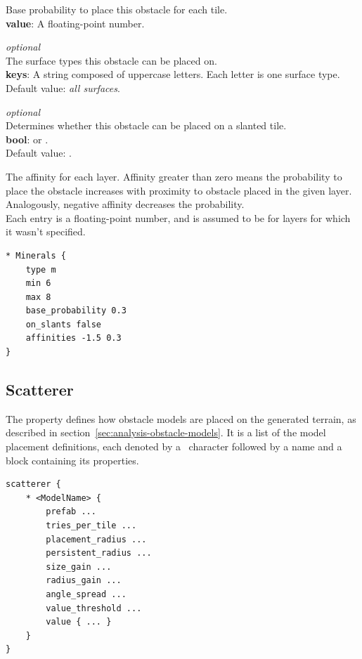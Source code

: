 Base probability to place this obstacle for each tile.\\
\textbf{value}: A floating-point number.

\emph{optional}\\
The surface types this obstacle can be placed on.\\
\textbf{keys}: A string composed of uppercase letters. Each letter is one surface type.\\
Default value: \emph{all surfaces}.

\emph{optional}\\
Determines whether this obstacle can be placed on a slanted tile.\\
\textbf{bool}:  or .\\
Default value: .

The affinity for each layer.
Affinity greater than zero means the probability to place the obstacle increases with proximity to obstacle placed in the given layer.
Analogously, negative affinity decreases the probability.\\
Each entry is a floating-point number, and is assumed to be  for layers for which it wasn't specified.

\begin{verbatim}
* Minerals {
    type m
    min 6
    max 8
    base_probability 0.3
    on_slants false
    affinities -1.5 0.3
}
\end{verbatim}

\subsection{Scatterer}

The  property defines how obstacle models are placed on the generated terrain, as described in section~\ref{sec:analysis-obstacle-models}.
It is a list of the model placement definitions, each denoted by a \mono{*}~character followed by a name and a block containing its properties.

\begin{verbatim}
scatterer {
    * <ModelName> {
        prefab ...
        tries_per_tile ...
        placement_radius ...
        persistent_radius ...
        size_gain ...
        radius_gain ...
        angle_spread ...
        value_threshold ...
        value { ... }
    }
}
\end{verbatim}

